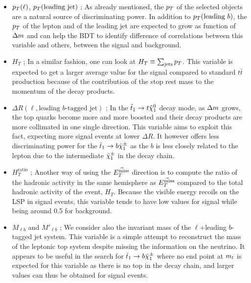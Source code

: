     \begin{itemize}
        \item $p_T(\ell)$, $p_T(\text{leading jet})$ ; As already mentioned, the $p_T$ of the
            selected objects are a natural source of discriminating power. In addition to
            $p_T(\text{leading }b)$, the $p_T$ of the lepton and of the leading jet are
            expected to grow as function of $\Delta m$ and can help the BDT to identify
            difference of correlations between this variable and others, between the
            signal and background.
        \item $H_T$ ; In a similar fashion, one can look at $H_T \equiv \sum_{\text{jets}} p_T$.
            This variable is expected to get a larger average value for the signal compared to standard
            $t\bar{t}$ production because of the contribution of the stop rest mass to the momentum of
            the decay products.
        \item $\Delta R( \ell, \text{leading } b\text{-tagged jet})$ ; In the $\tilde{t}_1
            \rightarrow t \tilde{\chi}_1^0$ decay mode, as $\Delta m$ grows, the top quarks become
            more and more boosted and their decay products are more collimated in one single
            direction. This variable aims to exploit this fact, expecting more signal events
            at lower $\Delta R$. It however offers less discriminating power for the $\tilde{t}_1
            \rightarrow b \tilde{\chi}_1^\pm$ as the $b$ is less closely related to the lepton due
            to the intermediate $\tilde{\chi}_1^\pm$ in the decay chain.
        \item $H_{T}^\text{ratio}$ ; Another way of using the $\vec{E_T^\text{miss}}$ direction is to
            compute the ratio of the hadronic activity in the same hemisphere as $\vec{E_T^\text{miss}}$
            compared to the total hadronic activity of the event, $H_T$. Because the visible
            energy recoils on the LSP in signal events, this variable tends to have low values
            for signal while being around 0.5 for background.
        \item $M_{\ell b}$ and $M'_{\ell b}$ ; We consider also the invariant mass of the
            $\ell$+leading $b$-tagged jet system. This variable is a simple attempt to
            reconstruct the mass of the leptonic top system despite missing the information
            on the neutrino. It appears to be useful in the search for $\tilde{t}_1 \rightarrow
            b \tilde{\chi}_1^\pm$ where no end point at $m_{t}$ is expected for this variable as there
            is no top in the decay chain, and larger values can thus be obtained for signal events.

\end{itemize}
